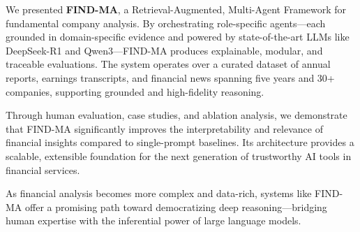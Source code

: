 \documentclass[11pt]{article}
\begin{document}
We presented \textbf{FIND-MA}, a Retrieval-Augmented, Multi-Agent Framework for fundamental company analysis. By orchestrating role-specific agents—each grounded in domain-specific evidence and powered by state-of-the-art LLMs like DeepSeek-R1 and Qwen3—FIND-MA produces explainable, modular, and traceable evaluations. The system operates over a curated dataset of annual reports, earnings transcripts, and financial news spanning five years and 30+ companies, supporting grounded and high-fidelity reasoning.

Through human evaluation, case studies, and ablation analysis, we demonstrate that FIND-MA significantly improves the interpretability and relevance of financial insights compared to single-prompt baselines. Its architecture provides a scalable, extensible foundation for the next generation of trustworthy AI tools in financial services.

As financial analysis becomes more complex and data-rich, systems like FIND-MA offer a promising path toward democratizing deep reasoning—bridging human expertise with the inferential power of large language models.






\newpage
%






\end{document}
